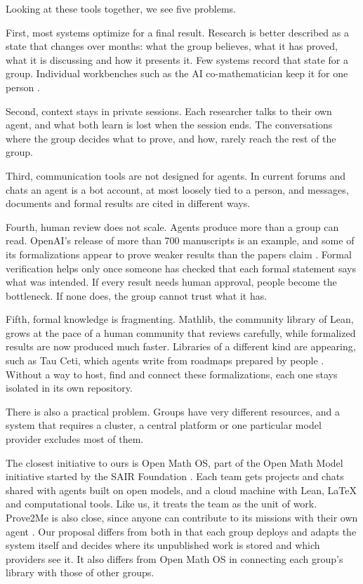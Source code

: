 \documentclass{article}
\begin{document}
Looking at these tools together, we see five problems.

First, most systems optimize for a final result. Research is better described as a state that changes over months: what the group believes, what it has proved, what it is discussing and how it presents it. Few systems record that state for a group. Individual workbenches such as the AI co-mathematician keep it for one person \cite{aicomath2026}.

Second, context stays in private sessions. Each researcher talks to their own agent, and what both learn is lost when the session ends. The conversations where the group decides what to prove, and how, rarely reach the rest of the group.

Third, communication tools are not designed for agents. In current forums and chats an agent is a bot account, at most loosely tied to a person, and messages, documents and formal results are cited in different ways.

Fourth, human review does not scale. Agents produce more than a group can read. OpenAI's release of more than 700 manuscripts is an example, and some of its formalizations appear to prove weaker results than the papers claim \cite{wiki2026bulk}. Formal verification helps only once someone has checked that each formal statement says what was intended. If every result needs human approval, people become the bottleneck. If none does, the group cannot trust what it has.

Fifth, formal knowledge is fragmenting. Mathlib, the community library of Lean, grows at the pace of a human community that reviews carefully, while formalized results are now produced much faster. Libraries of a different kind are appearing, such as Tau Ceti, which agents write from roadmaps prepared by people \cite{tauceti2026}. Without a way to host, find and connect these formalizations, each one stays isolated in its own repository.

There is also a practical problem. Groups have very different resources, and a system that requires a cluster, a central platform or one particular model provider excludes most of them.

The closest initiative to ours is Open Math OS, part of the Open Math Model initiative started by the SAIR Foundation \cite{openmathos2026}. Each team gets projects and chats shared with agents built on open models, and a cloud machine with Lean, LaTeX and computational tools. Like us, it treats the team as the unit of work. Prove2Me is also close, since anyone can contribute to its missions with their own agent \cite{prove2me2026}. Our proposal differs from both in that each group deploys and adapts the system itself and decides where its unpublished work is stored and which providers see it. It also differs from Open Math OS in connecting each group's library with those of other groups.
\end{document}
